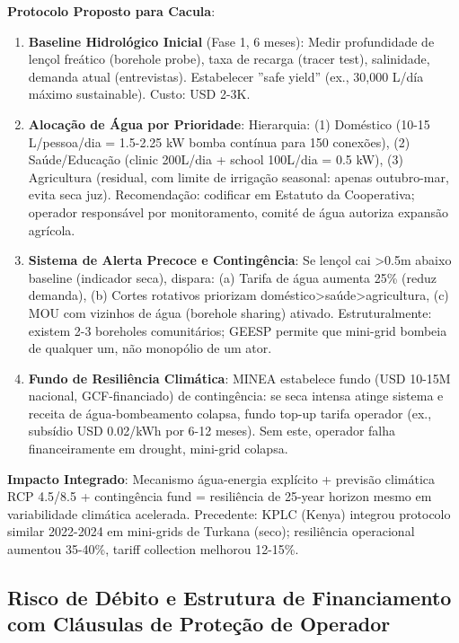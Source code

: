 \documentclass[12pt, a4paper]{article}
\begin{document}
\textbf{Protocolo Proposto para Cacula}:

\begin{enumerate}
\item \textbf{Baseline Hidrológico Inicial} (Fase 1, 6 meses): Medir profundidade de lençol freático (borehole probe), taxa de recarga (tracer test), salinidade, demanda atual (entrevistas). Estabelecer ''safe yield'' (ex., 30,000 L/día máximo sustainable). Custo: USD 2-3K.

\item \textbf{Alocação de Água por Prioridade}: Hierarquia: (1) Doméstico (10-15 L/pessoa/dia = 1.5-2.25 kW bomba contínua para 150 conexões), (2) Saúde/Educação (clinic 200L/dia + school 100L/dia = 0.5 kW), (3) Agricultura (residual, com limite de irrigação seasonal: apenas outubro-mar, evita seca juz). Recomendação: codificar em Estatuto da Cooperativa; operador responsável por monitoramento, comité de água autoriza expansão agrícola.

\item \textbf{Sistema de Alerta Precoce e Contingência}: Se lençol cai >0.5m abaixo baseline (indicador seca), dispara: (a) Tarifa de água aumenta 25\% (reduz demanda), (b) Cortes rotativos priorizam doméstico>saúde>agricultura, (c) MOU com vizinhos de água (borehole sharing) ativado. Estruturalmente: existem 2-3 boreholes comunitários; GEESP permite que mini-grid bombeia de qualquer um, não monopólio de um ator.

\item \textbf{Fundo de Resiliência Climática}: MINEA estabelece fundo (USD 10-15M nacional, GCF-financiado) de contingência: se seca intensa atinge sistema e receita de água-bombeamento colapsa, fundo top-up tarifa operador (ex., subsídio USD 0.02/kWh por 6-12 meses). Sem este, operador falha financeiramente em drought, mini-grid colapsa.

\end{enumerate}

\textbf{Impacto Integrado}: Mecanismo água-energia explícito + previsão climática RCP 4.5/8.5 + contingência fund = resiliência de 25-year horizon mesmo em variabilidade climática acelerada. Precedente: KPLC (Kenya) integrou protocolo similar 2022-2024 em mini-grids de Turkana (seco); resiliência operacional aumentou 35-40\%, tariff collection melhorou 12-15\%.

\subsection{Risco de Débito e Estrutura de Financiamento com Cláusulas de Proteção de Operador}
\end{document}
